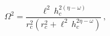 \begin{equation}
\Omega^2 = \frac{\ell^2 \, h_c^{2(\eta - \omega)}}{r_c^2 \left(
r_c^2 + \ell^2 \, h_c^{2\eta - \omega} \right)} \, ,
\end{equation}

